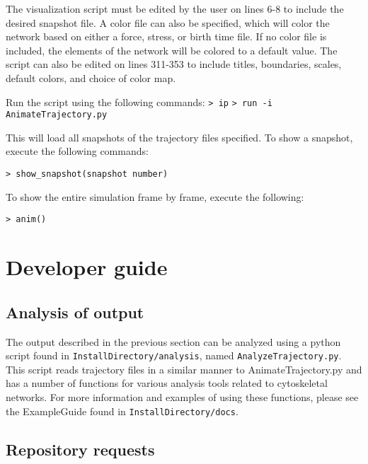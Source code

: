 \documentclass[11pt, oneside]{article}   	%
\begin{document}
The visualization script must be edited by the user on lines 6-8 to include the desired snapshot file. A color file can also be specified, which will color the network based on either a force, stress, or birth time file. If no color file is included, the elements of the network will be colored to a default value. The script can also be edited on lines 311-353 to include titles, boundaries, scales, default colors, and choice of color map. \newline

\noindent Run the script using the following commands:\newline\newline
\indent\texttt{> ip}\newline
\indent\texttt{> run -i AnimateTrajectory.py}\newline

\noindent This will load all snapshots of the trajectory files specified. To show a snapshot, execute the following commands:\newline

\texttt{> show\_snapshot(snapshot number)}\newline

\noindent To show the entire simulation frame by frame, execute the following:\newline

\texttt{> anim()}

\section{Developer guide}

\subsection{Analysis of output}

The output described in the previous section can be analyzed using a python script found in \texttt{InstallDirectory/analysis}, named \texttt{AnalyzeTrajectory.py}. This script reads trajectory files in a similar manner to AnimateTrajectory.py and has a number of functions for various analysis tools related to cytoskeletal networks. For more information and examples of using these functions, please see the ExampleGuide found in \texttt{InstallDirectory/docs}.

\subsection{Repository requests}
\end{document}
